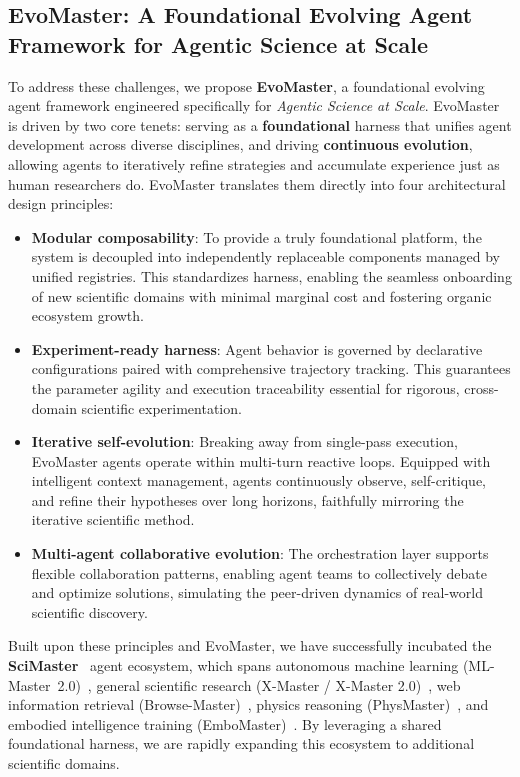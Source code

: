 \documentclass[11pt, a4paper, logo, copyright, nonumbering]{cls/Sci}
\begin{document}
\subsection{EvoMaster: A Foundational Evolving Agent Framework for Agentic Science at Scale}
To address these challenges, we propose \textbf{EvoMaster}, a foundational evolving agent framework engineered specifically for \emph{Agentic Science at Scale}. EvoMaster is driven by two core tenets: serving as a \textbf{foundational} harness that unifies agent development across diverse disciplines, and driving \textbf{continuous evolution}, allowing agents to iteratively refine strategies and accumulate experience just as human researchers do. EvoMaster translates them directly into four architectural design principles:

\begin{itemize}[leftmargin=*, nosep]
    \item \textbf{Modular composability}: To provide a truly foundational platform, the system is decoupled into independently replaceable components managed by unified registries. This standardizes harness, enabling the seamless onboarding of new scientific domains with minimal marginal cost and fostering organic ecosystem growth.
    \item \textbf{Experiment-ready harness}: Agent behavior is governed by declarative configurations paired with comprehensive trajectory tracking. This guarantees the parameter agility and execution traceability essential for rigorous, cross-domain scientific experimentation.
    \item \textbf{Iterative self-evolution}: Breaking away from single-pass execution, EvoMaster agents operate within multi-turn reactive loops. Equipped with intelligent context management, agents continuously observe, self-critique, and refine their hypotheses over long horizons, faithfully mirroring the iterative scientific method.
    \item \textbf{Multi-agent collaborative evolution}: The orchestration layer supports flexible collaboration patterns, enabling agent teams to collectively debate and optimize solutions, simulating the peer-driven dynamics of real-world scientific discovery.
\end{itemize}

Built upon these principles and EvoMaster, we have successfully incubated the \textbf{SciMaster}~\citep{zhang2025bohrium+} agent ecosystem, which spans autonomous machine learning (ML-Master~2.0)~\citep{sjtu2025mlmaster, sjtu2026mlmaster2}, general scientific research (X-Master / X-Master 2.0)~\citep{sjtu2025xmaster}, web information retrieval (Browse-Master)~\citep{sjtu2025browsemaster}, physics reasoning (PhysMaster)~\citep{sjtu2025physmaster}, and embodied intelligence training (EmboMaster)~\citep{sjtu2026embomaster}. By leveraging a shared foundational harness, we are rapidly expanding this ecosystem to additional scientific domains.
\end{document}
